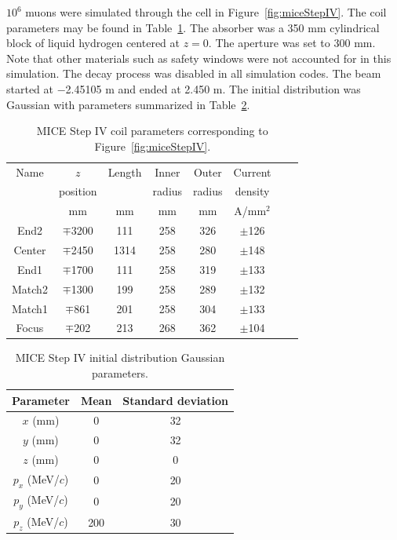 \documentclass[a4paper,11pt]{article}
\begin{document}
$10^6$ muons were simulated through the cell in Figure~\ref{fig:miceStepIV}. The coil parameters may be found in Table~\ref{tbl:MICE_coil_parameters}. The absorber was a 350 mm cylindrical block of liquid hydrogen centered at $z=0$. The aperture was set to 300 mm. Note that other materials such as safety windows were not accounted for in this simulation. The decay process was disabled in all simulation codes. The beam started at $-$2.45105 m and ended at 2.450 m. The initial distribution was Gaussian with parameters summarized in Table~\ref{tbl:MICE_initial_distribution_parameters}.
\begin{table}
\begin{center}
\begin{tabularx}{0.6\columnwidth}{cccccccc}
\hline \hline
Name & $z$ & Length & Inner & Outer & Current \\
 & position & & radius & radius & density \\
 & mm & mm & mm & mm & A/mm$^2$  \\
\hline
	End2 & $\mp$3200 &111 & 258 &326 &$\pm$126 \\
	Center&$\mp$2450 &1314 & 258 &280 &$\pm$148 \\
	End1 & $\mp$1700 & 111 & 258 & 319 & $\pm$133 \\
	Match2 & $\mp$1300 & 199 & 258 & 289 & $\pm$132 \\
	Match1 & $\mp$861 & 201 & 258 & 304 & $\pm133$ \\
	Focus & $\mp$202 & 213 & 268 & 362 & $\pm$104 \\ 
\hline
\end{tabularx}
\end{center}
\caption[MICE Step IV coil parameters.]{MICE Step IV coil parameters corresponding to Figure~\ref{fig:miceStepIV}.}
\label{tbl:MICE_coil_parameters}
\end{table}

\begin{table}
\begin{center}
\begin{tabularx}{0.5\columnwidth}{ccc}
\hline \hline
Parameter & Mean & Standard deviation \\
\hline
	$x$ (mm) & 0 & 32\\
	$y$ (mm) & 0 & 32 \\
	$z$ (mm) & 0 & 0\\
	$p_x$ (MeV/$c$) & 0 & 20\\
	$p_y$ (MeV/$c$) & 0 & 20\\
	$p_z$ (MeV/$c$) & 200 & 30\\
\hline
\end{tabularx}
\end{center}
\caption{MICE Step IV initial distribution Gaussian parameters.}
\label{tbl:MICE_initial_distribution_parameters}
\end{table}
\end{document}
